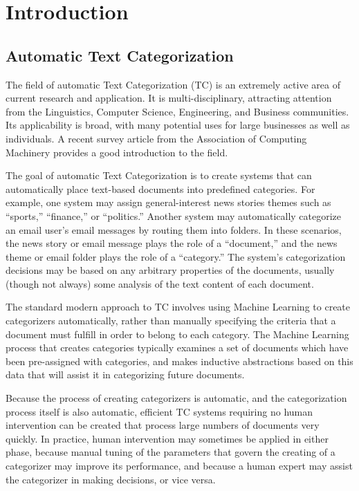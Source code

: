 \chapter{Introduction}

\section{Automatic Text Categorization}
\label{tc-intro}

The field of automatic Text Categorization (TC) is an extremely active
area of current research and application.  It is multi-disciplinary,
attracting attention from the Linguistics, Computer Science,
Engineering, and Business communities.  Its applicability is broad,
with many potential uses for large businesses as well as individuals.
A recent survey article from the Association of Computing Machinery
provides a good introduction to the field. \cite{sebastiani:02}

The goal of automatic Text Categorization is to create systems that
can automatically place text-based documents into predefined
categories.  For example, one system may assign general-interest news
stories themes such as ``sports,'' ``finance,'' or ``politics.''
Another system may automatically categorize an email user's email
messages by routing them into folders.  In these scenarios, the news
story or email message plays the role of a ``document,'' and the news
theme or email folder plays the role of a ``category.''  The system's
categorization decisions may be based on any arbitrary properties of
the documents, usually (though not always) some analysis of the text
content of each document.

The standard modern approach to TC involves using Machine Learning to
create categorizers automatically, rather than manually specifying the
criteria that a document must fulfill in order to belong to each
category. \cite[p. 2]{sebastiani:02} The Machine Learning process that
creates categories typically examines a set of documents which have
been pre-assigned with categories, and makes inductive abstractions
based on this data that will assist it in categorizing future
documents. \cite[ch. XXX]{mitchell:97}

Because the process of creating categorizers is automatic, and the
categorization process itself is also automatic, efficient TC systems
requiring no human intervention can be created that process large
numbers of documents very quickly.  In practice, human intervention
may sometimes be applied in either phase, because manual tuning of the
parameters that govern the creating of a categorizer may improve its
performance, and because a human expert may assist the categorizer in
making decisions, or vice versa.


